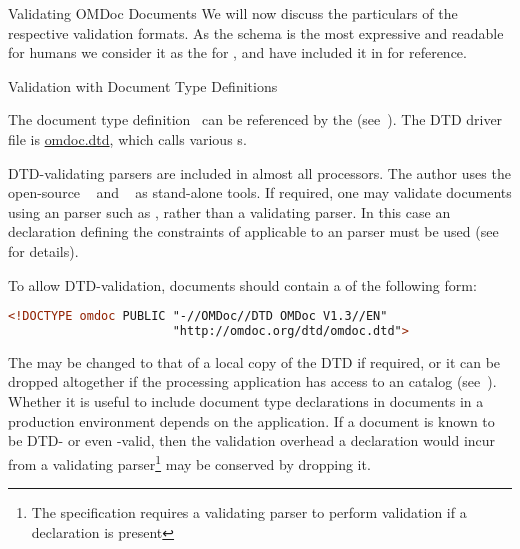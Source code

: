 \begin{tchapter}[id=validating]{Validating OMDoc Documents}
We will now discuss the particulars of the respective validation formats. As the
{\relaxng} schema is the most expressive and readable for humans we consider it as the
{} for {\omdoc}, and have included it in
{} for reference.

\begin{tsection}[id=validate-dtd]{Validation with Document Type Definitions}
  
  The {\omdoc} document type definition~\cite{OMDocDTD:URL} can be referenced by the
  {} {}
  (see~). The DTD driver file is \url{omdoc.dtd}, which calls various
  {s}.
  
  DTD-validating {\xml} parsers are included in almost all {\xml} processors. The author
  uses the open-source {\rxp}~\cite{Tobin:RXP} and
  {}~\cite{Veillard:libxml2} as stand-alone tools. If required, one may
  validate {\omdoc} documents using an {\sgml} parser such as {\nsgmls}, rather than a
  validating {\xml} parser. In this case an {\sgml} declaration defining the constraints
  of {\xml} applicable to an {\sgml} parser must be used (see~\cite{Clark:csx97} for
  details).

  To allow DTD-validation, {\omdoc} documents should contain a {} of the following form:
\begin{center}
\begin{lstlisting}[language=XML,index={DOCTYPE,omdoc}]
<!DOCTYPE omdoc PUBLIC "-//OMDoc//DTD OMDoc V1.3//EN"
                       "http://omdoc.org/dtd/omdoc.dtd">
\end{lstlisting}
\end{center}
The {} may be changed to that of a local copy of the DTD if required, or it
can be dropped altogether if the processing application has access to an {\xml}
catalog (see~).  Whether it is useful to include
document type declarations in documents in a production environment depends on the
application. If a document is known to be DTD- or even {\omdoc}-valid, then the validation
overhead a {} declaration would incur from a validating
parser\footnote{The {\xml} specification requires a validating parser to perform
  validation if a {} declaration is present} may be conserved by
dropping it.



\end{tsection}
\end{tchapter}
